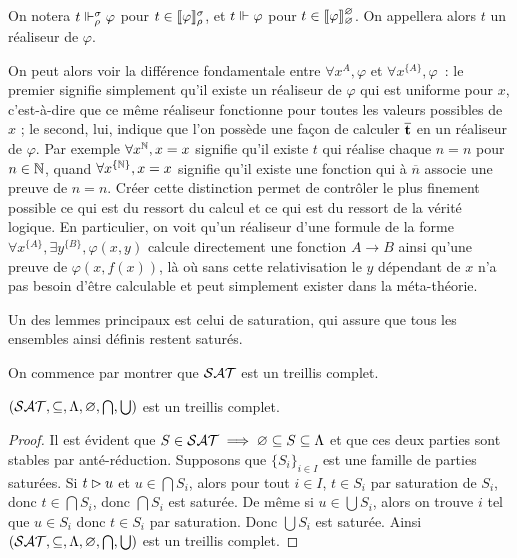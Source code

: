 \documentclass{article}
\begin{document}
\begin{nota}
  On notera $t\Vdash_\rho^\sigma \varphi$ pour $t\in\llbracket \varphi \rrbracket_\rho^\sigma$, et $t\Vdash\varphi$ pour $t\in\llbracket \varphi \rrbracket_\varnothing^\varnothing$. On appellera alors $t$ un réaliseur de $\varphi$.
\end{nota}

On peut alors voir la différence fondamentale entre $\forall x^A, \varphi$ et $\forall x^{\{A\}}, \varphi$~: le premier signifie simplement qu'il existe un réaliseur de $\varphi$ qui est uniforme pour $x$, c'est-à-dire que ce même réaliseur fonctionne pour toutes les valeurs possibles de $x$ ; le second, lui, indique que l'on possède une façon de calculer $\overline {\mathbf{t}}$ en un réaliseur de $\varphi$. Par exemple $\forall x^{\mathbb{N}}, x = x$ signifie qu'il existe $t$ qui réalise chaque $n = n$ pour $n\in \mathbb{N}$, quand $\forall x^{\{\mathbb{N}\}}, x = x$ signifie qu'il existe une fonction qui à $\overline n$ associe une preuve de $n = n$. Créer cette distinction permet de contrôler le plus finement possible ce qui est du ressort du calcul et ce qui est du ressort de la vérité logique. En particulier, on voit qu'un réaliseur d'une formule de la forme $\forall x^{\{A\}}, \exists y^{\{B\}}, \varphi(x,y)$ calcule directement une fonction $A \to B$ ainsi qu'une preuve de $\varphi(x,f(x))$, là où sans cette relativisation le $y$ dépendant de $x$ n'a pas besoin d'être calculable et peut simplement exister dans la méta-théorie.

Un des lemmes principaux est celui de saturation, qui assure que tous les ensembles ainsi définis restent saturés.

On commence par montrer que $\mathcal {SAT}$ est un treillis complet.

\begin{lem}
  $(\mathcal {SAT},\subseteq,\Lambda,\varnothing,\bigcap,\bigcup)$ est un treillis complet.
\end{lem}

\begin{proof}
  Il est évident que $S\in \mathcal {SAT} \implies \varnothing\subseteq S \subseteq \Lambda$ et que ces deux parties sont stables par anté-réduction. Supposons que $\{S_i\}_{i\in I}$ est une famille de parties saturées. Si $t\rhd u$ et $u \in \bigcap S_i$, alors pour tout $i \in I$, $t \in S_i$ par saturation de $S_i$, donc $t\in \bigcap S_i$, donc $\bigcap S_i$ est saturée. De même si $u \in \bigcup S_i$, alors on trouve $i$ tel que $u \in S_i$ donc $t\in S_i$ par saturation. Donc $\bigcup S_i$ est saturée. Ainsi $(\mathcal {SAT},\subseteq,\Lambda,\varnothing, \bigcap,\bigcup)$ est un treillis complet.
\end{proof}
\end{document}
